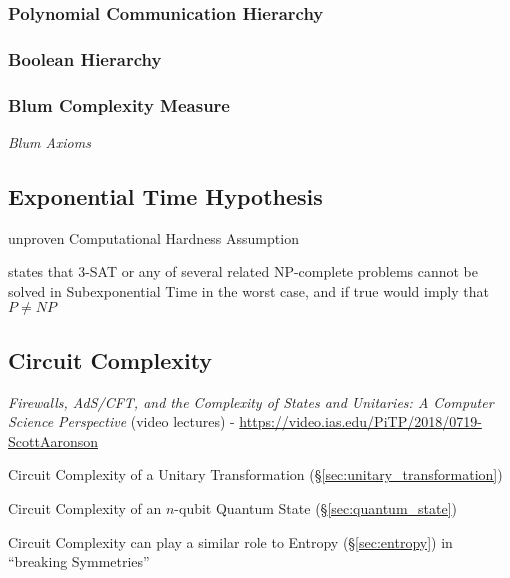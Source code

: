 \subsubsection{Polynomial Communication Hierarchy}

\subsubsection{Boolean Hierarchy}




\subsubsection{Blum Complexity Measure}

\emph{Blum Axioms}



\subsection{Exponential Time Hypothesis}\label{sec:exponential_time_hypothesis}

unproven Computational Hardness Assumption

states that 3-SAT or any of several related NP-complete problems cannot be
solved in Subexponential Time in the worst case, and if true would imply that
$P \neq NP$



\subsection{Circuit Complexity}\label{sec:circuit_complexity}

\emph{Firewalls, AdS/CFT, and the Complexity of States and Unitaries: A Computer
  Science Perspective}
(video lectures)
-
\url{https://video.ias.edu/PiTP/2018/0719-ScottAaronson}

Circuit Complexity of a Unitary Transformation
(\S\ref{sec:unitary_transformation})

Circuit Complexity of an $n$-qubit Quantum State (\S\ref{sec:quantum_state})

Circuit Complexity can play a similar role to Entropy (\S\ref{sec:entropy}) in
``breaking Symmetries''

